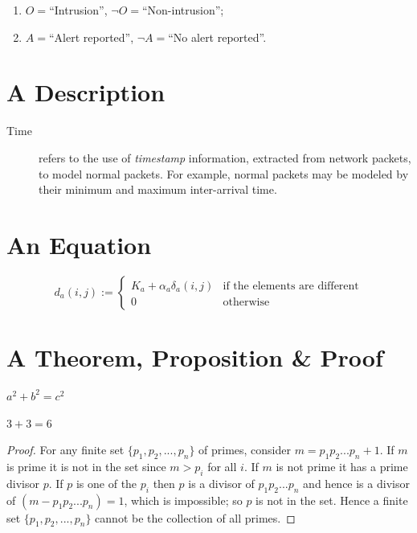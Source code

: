 \begin{enumerate}
\item $O = $``Intrusion'', $\neg O =$``Non-intrusion'';
\item $A = $``Alert reported'', $\neg A =$``No alert reported''.
\end{enumerate}


\section{A Description}

\begin{description}
\item[Time] refers to the use of \emph{timestamp} information, extracted from network packets, to model normal packets. For example, normal packets may be modeled by their minimum and maximum inter-arrival time.

\end{description}


\section{An Equation}

\begin{equation}
d_a(i,j) := \left\{
\begin{array}{lll}
K_a + \alpha_{a} \delta_{a}(i,j) & \mbox{if the elements are different} \\
0 & \mbox{otherwise}
\end{array}
\right.
\label{eq:distfunction}
\end{equation}


\section{A Theorem, Proposition \& Proof}

\begin{thm}
$a^2 + b^2 = c^2$
\end{thm}

\begin{prop}
$3 + 3 = 6$
\end{prop}

\begin{proof}
For any finite set $\{p_1,p_2,...,p_n\}$ of primes, consider $m = p_1p_2...p_n+1$. If $m$ is prime it is not in the set since $m > p_i$ for all $i$. If $m$ is not prime it has a prime divisor $p$. If $p$ is one of the $p_i$ then $p$ is a divisor of $p_1p_2...p_n$ and hence is a divisor of $(m - p_1p_2...p_n) = 1$, which is impossible; so $p$ is not in the set. Hence a finite set $\{p_1,p_2,...,p_n\}$ cannot be the collection of all primes.
\end{proof}

